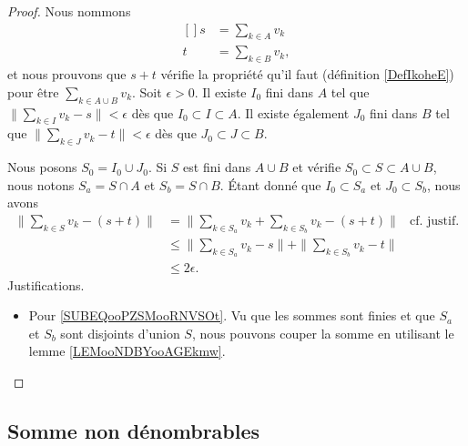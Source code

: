 \begin{proof}
	Nous nommons
	\begin{equation}
		\begin{aligned}[]
			s & =\sum_{k\in A}v_k  \\
			t & =\sum_{k\in B}v_k,
		\end{aligned}
	\end{equation}
	et nous prouvons que \( s+t\) vérifie la propriété qu'il faut (définition \ref{DefIkoheE}) pour être \( \sum_{k\in A\cup B}v_k\). Soit \( \epsilon>0\). Il existe \( I_0\) fini dans \( A\) tel que \( \| \sum_{k\in I}v_k-s \|<\epsilon\) dès que \( I_0\subset I\subset A\). Il existe également \( J_0\) fini dans \( B\) tel que \( \| \sum_{k\in J}v_k-t \|<\epsilon\) dès que \( J_0\subset J\subset B\).

	Nous posons \( S_0=I_0\cup J_0\). Si \( S\) est fini dans \( A\cup B\) et vérifie \( S_0\subset S\subset A\cup B\), nous notons \( S_a=S\cap A\) et \( S_b=S\cap B\). Étant donné que \( I_0\subset S_a\) et \( J_0\subset S_b\), nous avons
	\begin{subequations}
		\begin{align}
			\| \sum_{k\in S}v_k-(s+t) \| & =\| \sum_{k\in S_a}v_k+\sum_{k\in S_b}v_k-(s+t) \|         & \text{cf. justif.} 	\label{SUBEQooPZSMooRNVSOt} \\
			                             & \leq \| \sum_{k\in S_a}v_k-s \|+\| \sum_{k\in S_b}v_k-t \|                                                  \\
			                             & \leq 2\epsilon.
		\end{align}
	\end{subequations}
	Justifications.
	\begin{itemize}
		\item
		      Pour \ref{SUBEQooPZSMooRNVSOt}. Vu que les sommes sont finies et que \( S_a\) et \( S_b\) sont disjoints d'union \( S\), nous pouvons couper la somme en utilisant le lemme \ref{LEMooNDBYooAGEkmw}.
	\end{itemize}
\end{proof}

\subsection{Somme non dénombrables}

